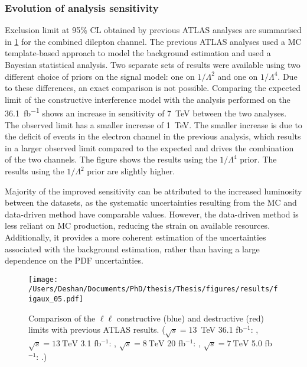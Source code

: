 \subsubsection{Evolution of analysis sensitivity}\label{sec:results:evol}
Exclusion limit at 95\% CL obtained by previous ATLAS analyses are summarised in \cref{fig:limit_evol} for the combined dilepton channel. The previous ATLAS analyses used a MC template-based approach to model the background estimation and used a Bayesian statistical analysis. Two separate sets of results were available using two different choice of priors on the signal model: one on $1/\Lambda^2$ and one on $1/\Lambda^4$. Due to these differences, an exact comparison is not possible. Comparing the expected limit of the constructive interference model with the analysis performed on the \SI{36.1}{\femto\barn^{-1}} shows an increase in sensitivity of \SI{7}{\tera\electronvolt} between the two analyses. The observed limit has a smaller increase of \SI{1}{\tera\electronvolt}. The smaller increase is due to the deficit of events in the electron channel in the previous analysis, which results in a larger observed limit compared to the expected and drives the combination of the two channels. The figure shows the results using the $1/\Lambda^4$ prior. The results using the $1/\Lambda^2$ prior are slightly higher.

Majority of the improved sensitivity can be attributed to the increased luminosity between the datasets, as the systematic uncertainties resulting from the MC and data-driven method have comparable values. However, the data-driven method is less reliant on MC production, reducing the strain on available resources. Additionally, it provides a more coherent estimation of the uncertainties associated with the background estimation, rather than having a large dependence on the PDF uncertainties. 

\begin{figure}[!htpb]
    \centering
    \texttt{[image: /Users/Deshan/Documents/PhD/thesis/Thesis/figures/results/figaux\_05.pdf]}
    \caption[Comparison of the $\ell\ell$ constructive (blue) and destructive (red) limits with previous ATLAS results.]{Comparison of the $\ell\ell$ constructive (blue) and destructive (red) limits with previous ATLAS results. ($\sqrt{s}=13$~TeV 36.1 fb$^{-1}$: \cite{EXOT-2016-05}, $\sqrt{s}=\SI{13}{\tera\electronvolt}$ 3.1 fb$^{-1}$: \cite{EXOT-2015-07}, $\sqrt{s}=\SI{8}{\tera\electronvolt}$ 20 fb$^{-1}$: \cite{EXOT-2013-19}, $\sqrt{s}=\SI{7}{\tera\electronvolt}$ 5.0 fb$^{-1}$: \cite{EXOT-2012-17}.)}
    \label{fig:limit_evol}
\end{figure}
